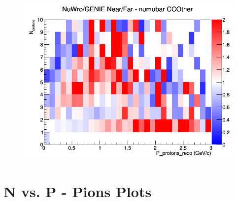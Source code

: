 \documentclass[12pt]{article}
\begin{document}
\begin{figure}[h]
\endminipage
{}
\includegraphics[width=\linewidth]{eff_N_P/GAr/protons/ratios/CCOther_NuWro_GENIE_numubar_NF_N_P.png}
\endminipage
\newline
\end{figure}
\clearpage

\newpage
\section{N vs. P - Pions Plots}
\end{document}
